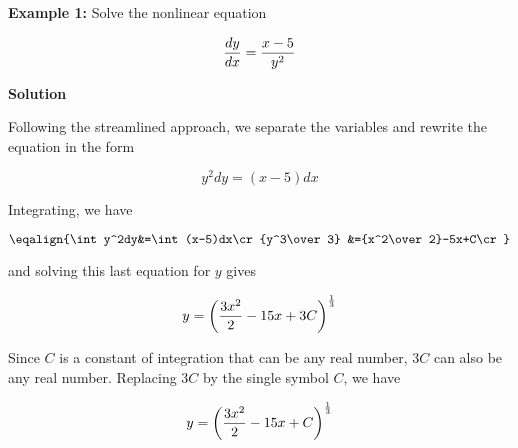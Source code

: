 \nopagenumbers
{\bf Example 1:} Solve the nonlinear equation

$${dy\over dx}={x-5\over y^2}$$ 

\vskip 10pt
{\bf Solution}

\vskip 6pt
Following the streamlined approach, we separate the variables and rewrite the equation in the form

$$y^2dy=(x-5)dx$$

Integrating, we have

$$\eqalign{\int y^2dy&=\int (x-5)dx\cr
	{y^3\over 3} &={x^2\over 2}-5x+C\cr}$$

and solving this last equation for $y$ gives

$$y=\biggl({3x^2\over 2}-15x+3C\biggr)^{1\over 3}$$

Since $C$ is a constant of integration that can be any real number, $3C$ can also be any real number. Replacing $3C$ by the single symbol $C$, we have

$$y=\biggl({3x^2\over 2}-15x+C\biggr)^{1\over 3}$$

\vfill\eject
\bye
